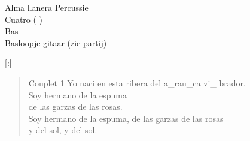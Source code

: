 \begin{song}[joropo]{Alma llanera}
Percussie\\
Cuatro ( )\\
Bas\\
Basloopje gitaar (zie partij)\\

\begin{instrumental}{}
   \measure{}[:]  \measure{}  \measure{} 
\end{instrumental}

\begin{verse}{Couplet 1}
Yo naci en esta ribera del a\_rau\_ca vi\_  brador. \hspace{1em}  \hspace{1em}  \hspace{1em}\\
  Soy hermano de la espuma  \hspace{1em} \hspace{1em}  \hspace{1em}\\
  de las garzas de las rosas.  \hspace{1em} \hspace{1em}  \hspace{1em}\\
  Soy hermano de la espuma, de las garzas de las rosas\\
y del sol, y del sol.   \hspace{\wlskip}\\
\end{verse}


\end{song}
